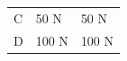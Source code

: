 \begin{enumerate}[noitemsep, label=\textbf{\arabic*}. ]
{\begin{tabular}[t]{|l|l|l|}
        C &
    
    
        50 N &
    
    
        50 N%
     \tabularnewline\cline{1-1}\cline{2-2}\cline{3-3}
    
    
        D &
    
    
        100 N &
    
    
        100 N%
     \tabularnewline\cline{1-1}\cline{2-2}\cline{3-3}
    \end{tabular}} %
      \addtocounter{footnote}{-0}
      
    
\end{enumerate}

